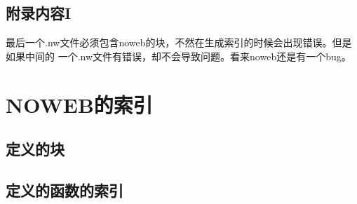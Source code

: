 \subsection{附录内容I}

最后一个.nw文件必须包含noweb的块，不然在生成索引的时候会出现错误。但是如果中间的
一个.nw文件有错误，却不会导致问题。看来noweb还是有一个bug。

\section{NOWEB的索引}

\subsection{定义的块}

\nowebchunks


\subsection{定义的函数的索引}

\nowebindex



